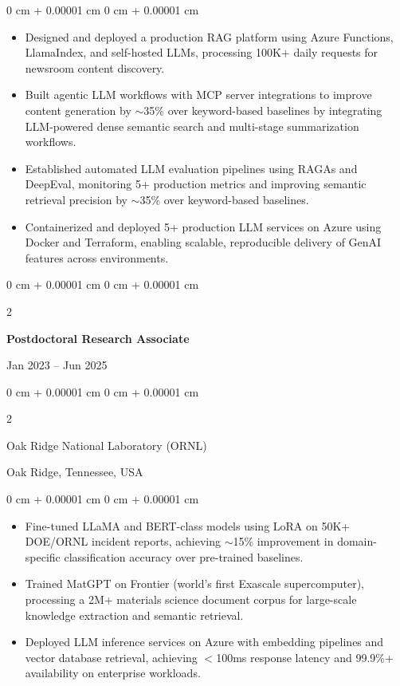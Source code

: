 \documentclass[10pt, letterpaper]{article}
\newenvironment{highlights}{
    \begin{itemize}[
        topsep=0.10 cm,
        parsep=0.10 cm,
        partopsep=0pt,
        itemsep=0pt,
        leftmargin=0 cm + 10pt
    ]
}{
    \end{itemize}
} %
\newenvironment{onecolentry}{
    \begin{adjustwidth}{
        0 cm + 0.00001 cm
    }{
        0 cm + 0.00001 cm
    }
}{
    \end{adjustwidth}
} %
\newenvironment{twocolentry}[2][]{
    \onecolentry
    \def\secondColumn{#2}
    \setcolumnwidth{\fill, 4.5 cm}
    \begin{paracol}{2}
}{
    \switchcolumn \raggedleft \secondColumn
    \end{paracol}
    \endonecolentry
} %
\begin{document}
    \begin{onecolentry}
        \begin{highlights}
            \item Designed and deployed a production RAG platform using Azure Functions, LlamaIndex, and self-hosted LLMs, processing 100K+ daily requests for newsroom content discovery.
            \item Built agentic LLM workflows with MCP server integrations to improve content generation by $\sim$35\% over keyword-based baselines by integrating LLM-powered dense semantic search and multi-stage summarization workflows.
            \item Established automated LLM evaluation pipelines using RAGAs and DeepEval, monitoring 5+ production metrics and improving semantic retrieval precision by $\sim$35\% over keyword-based baselines.
            \item Containerized and deployed 5+ production LLM services on Azure using Docker and Terraform, enabling scalable, reproducible delivery of GenAI features across environments.
        \end{highlights}
    \end{onecolentry}

\vspace{1mm}

    \begin{twocolentry}{Jan 2023 -- Jun 2025}
        \textbf{Postdoctoral Research Associate}
    \end{twocolentry}
    \begin{twocolentry}{Oak Ridge, Tennessee, USA}
        Oak Ridge National Laboratory (ORNL)
    \end{twocolentry}
    \vspace{0.10 cm}
    \begin{onecolentry}
        \begin{highlights}
            \item Fine-tuned LLaMA and BERT-class models using LoRA on 50K+ DOE/ORNL incident reports, achieving $\sim$15\% improvement in domain-specific classification accuracy over pre-trained baselines.
            \item Trained MatGPT on Frontier (world's first Exascale supercomputer), processing a 2M+ materials science document corpus for large-scale knowledge extraction and semantic retrieval.
            \item Deployed LLM inference services on Azure with embedding pipelines and vector database retrieval, achieving $<$100ms response latency and 99.9\%+ availability on enterprise workloads.
        \end{highlights}
    \end{onecolentry}
\end{document}
